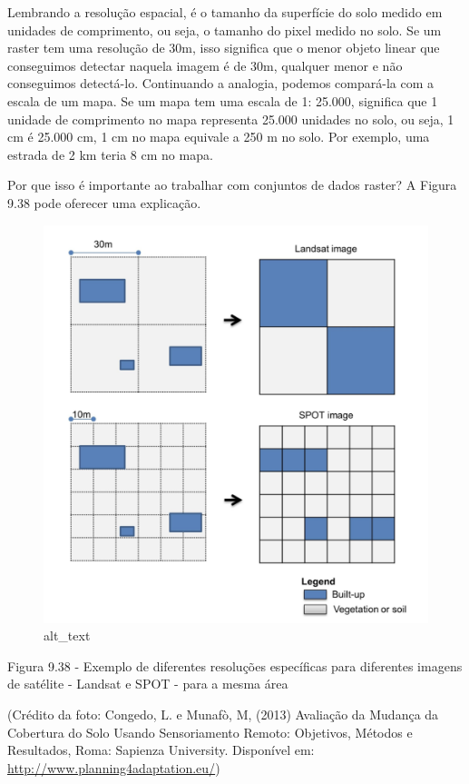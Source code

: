 \documentclass[
  portuguese,
]{krantz}
\begin{document}
Lembrando a resolução espacial, é o tamanho da superfície do solo medido em unidades de comprimento, ou seja, o tamanho do pixel medido no solo. Se um raster tem uma resolução de 30m, isso significa que o menor objeto linear que conseguimos detectar naquela imagem é de 30m, qualquer menor e não conseguimos detectá-lo. Continuando a analogia, podemos compará-la com a escala de um mapa. Se um mapa tem uma escala de 1: 25.000, significa que 1 unidade de comprimento no mapa representa 25.000 unidades no solo, ou seja, 1 cm é 25.000 cm, 1 cm no mapa equivale a 250 m no solo. Por exemplo, uma estrada de 2 km teria 8 cm no mapa.

Por que isso é importante ao trabalhar com conjuntos de dados raster? A Figura 9.38 pode oferecer uma explicação.

\begin{figure}
\centering
\includegraphics{media/modulo9/fig938.png}
\caption{alt\_text}
\end{figure}

Figura 9.38 - Exemplo de diferentes resoluções específicas para diferentes imagens de satélite - Landsat e SPOT - para a mesma área

(Crédito da foto: Congedo, L. e Munafò, M, (2013) Avaliação da Mudança da Cobertura do Solo Usando Sensoriamento Remoto: Objetivos, Métodos e Resultados, Roma: Sapienza University. Disponível em: \url{http://www.planning4adaptation.eu/})
\end{document}

